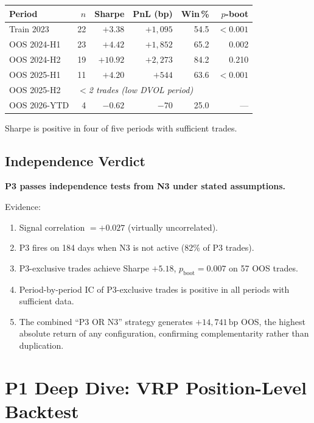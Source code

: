 \documentclass[12pt, a4paper]{article}
\theoremstyle{plain}
\theoremstyle{definition}
\newcommand{\bp}{\,\mathrm{bp}}
\begin{document}
\begin{center}
\begin{tabular}{lrrrrr}
\toprule
Period & $n$ & Sharpe & PnL (bp) & Win\,\% & $p$-boot \\
\midrule
Train 2023    & 22 & $+3.38$ & $+1{,}095$ & 54.5 & $<0.001$ \\
OOS 2024-H1   & 23 & $+4.42$ & $+1{,}852$ & 65.2 & 0.002   \\
OOS 2024-H2   & 19 & $+10.92$ & $+2{,}273$ & 84.2 & 0.210  \\
OOS 2025-H1   & 11 & $+4.20$ & $+544$     & 63.6 & $<0.001$ \\
OOS 2025-H2   & \multicolumn{5}{l}{\textit{$<$2 trades (low DVOL period)}} \\
OOS 2026-YTD  &  4 & $-0.62$ & $-70$      & 25.0 & --- \\
\bottomrule
\end{tabular}
\end{center}

Sharpe is positive in four of five periods with sufficient trades.

\subsection{Independence Verdict}

\textbf{P3 passes independence tests from N3 under stated assumptions.}

Evidence:
\begin{enumerate}
  \item Signal correlation $= +0.027$ (virtually uncorrelated).
  \item P3 fires on 184 days when N3 is not active (82\% of P3 trades).
  \item P3-exclusive trades achieve Sharpe $+5.18$,
        $p_{\mathrm{boot}} = 0.007$ on 57 OOS trades.
  \item Period-by-period IC of P3-exclusive trades is positive in all
        periods with sufficient data.
  \item The combined ``P3 OR N3'' strategy generates $+14{,}741\bp$ OOS,
        the highest absolute return of any configuration, confirming
        complementarity rather than duplication.
\end{enumerate}

\section{P1 Deep Dive: VRP Position-Level Backtest}
\label{sec:p1deepdive}
\end{document}
